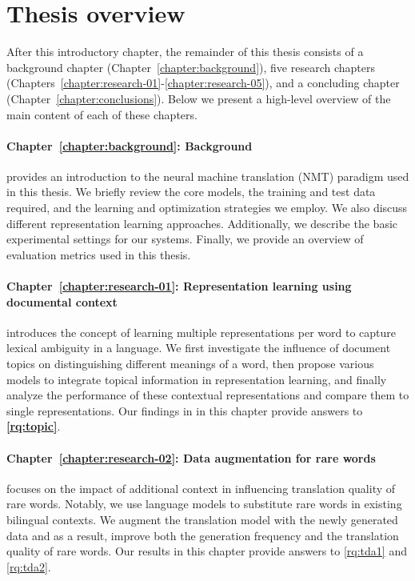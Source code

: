 
\section{Thesis overview}
\label{section:introduction:overview}

After this introductory chapter, the remainder of this thesis consists of a background chapter (Chapter~\ref{chapter:background}), five research chapters (Chapters~\ref{chapter:research-01}-\ref{chapter:research-05}), and a concluding chapter (Chapter~\ref{chapter:conclusions}). 
Below we present a high-level overview of the main content of each of these chapters. 


\paragraph{Chapter~\ref{chapter:background}: Background} provides an introduction to the neural machine translation (NMT) paradigm used in this thesis. We briefly review the core models, the training and test data required, and the learning and optimization strategies we employ. We also discuss different representation learning approaches. Additionally, we describe the basic experimental settings for our systems. 
Finally, we provide an overview of evaluation metrics used in this thesis.  

\paragraph{Chapter~\ref{chapter:research-01}: Representation learning using documental context } introduces the concept of learning multiple representations per word to capture lexical ambiguity in a language. 
We first investigate the influence of document topics on distinguishing different meanings of a word, then propose various models to integrate topical information in representation learning, and finally analyze the performance of these contextual representations and compare them to single representations. 
Our findings in in this chapter provide answers to \textbf{\ref{rq:topic}}.

\paragraph{Chapter~\ref{chapter:research-02}: Data augmentation for rare words} focuses on the impact of additional context in influencing translation quality of rare words. 
Notably, we use language models to substitute rare words in existing bilingual contexts. 
We augment the translation model with the newly generated data and as a result, improve both the generation frequency and the translation quality of rare words.
Our results in this chapter provide answers to \ref{rq:tda1} and \ref{rq:tda2}.

